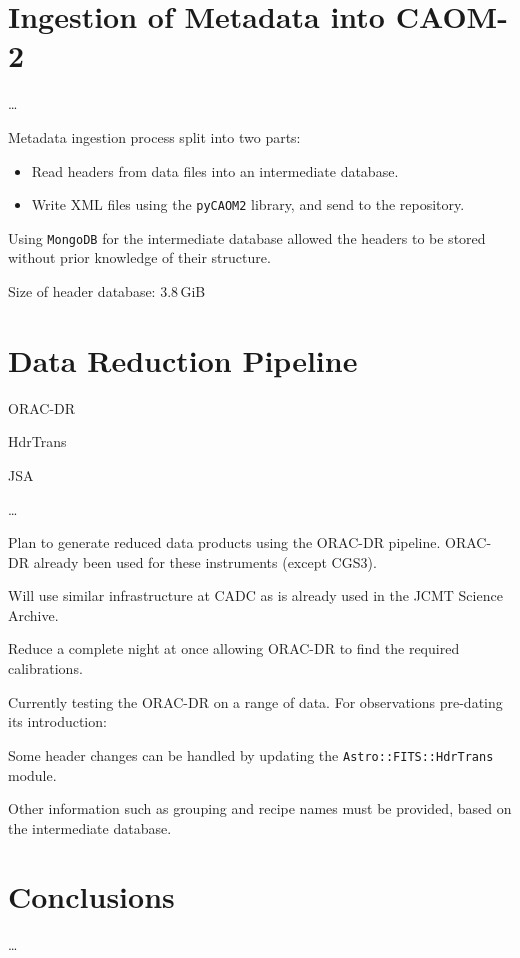\documentclass[11pt,twoside]{article}
\begin{document}
\section{Ingestion of Metadata into CAOM-2}

\ldots

Metadata ingestion process split into two parts:

\begin{itemize}
\item Read headers from data files into an intermediate database.

\item Write XML files using the \texttt{pyCAOM2} library, and send to the repository.
\end{itemize}

Using \texttt{MongoDB} for the intermediate database allowed the
headers to be stored without prior knowledge of their structure.

Size of header database: 3.8\,GiB

\section{Data Reduction Pipeline}

ORAC-DR \citep{1999ASPC..172...11E,2008AN....329..295C}

HdrTrans \citep[section 2.2]{2008AN....329..295C}

JSA \citep{2011ASPC..442..203E}

\ldots

Plan to generate reduced data products using the ORAC-DR pipeline.
ORAC-DR already been used for these instruments (except CGS3).

Will use similar infrastructure at CADC as is already
used in the JCMT Science Archive.

Reduce a complete night at once allowing
ORAC-DR to find the required calibrations.

Currently testing the ORAC-DR on a range of data.
For observations pre-dating its introduction:

Some header changes can be handled by updating the
\texttt{Astro::FITS::HdrTrans} module.

Other information such as grouping and recipe names
must be provided, based on the intermediate database.

\section{Conclusions}

\ldots


\end{document}
